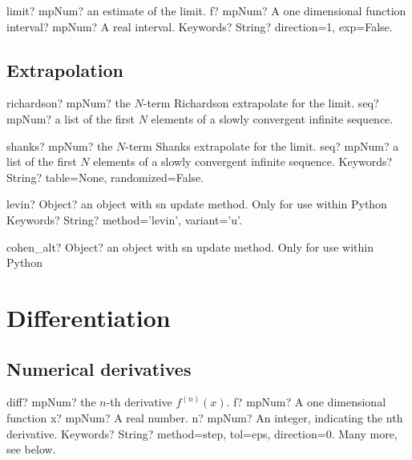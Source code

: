 \documentclass[12pt,a4paper,openany]{book}
\begin{document}
\begin{mpFunctionsExtract}
\mpFunctionThree
{limit? mpNum? an estimate of the limit.}
{f? mpNum? A one dimensional function}
{interval? mpNum? A real interval.}
{Keywords? String? direction=1, exp=False.}
\end{mpFunctionsExtract}

\section{Extrapolation}

\begin{mpFunctionsExtract}
\mpFunctionOne
{richardson? mpNum? the $N$-term Richardson extrapolate for the limit.}
{seq? mpNum? a list of the first $N$ elements of a slowly convergent infinite sequence.}
\end{mpFunctionsExtract}

\begin{mpFunctionsExtract}
\mpFunctionTwo
{shanks? mpNum? the $N$-term Shanks extrapolate for the limit.}
{seq? mpNum? a list of the first $N$ elements of a slowly convergent infinite sequence.}
{Keywords? String? table=None, randomized=False.}
\end{mpFunctionsExtract}

\begin{mpFunctionsExtract}
\mpFunctionOne
{levin? Object? an object with sn update method. Only for use within Python}
{Keywords? String? method='levin', variant='u'.}
\end{mpFunctionsExtract}

\begin{mpFunctionsExtract}
\mpFunctionZero
{cohen\_alt? Object? an object with sn update method. Only for use within Python}
\end{mpFunctionsExtract}

\chapter{Differentiation}

\section{Numerical derivatives}

\begin{mpFunctionsExtract}
\mpFunctionFour
{diff? mpNum? the $n$-th derivative $f^{(n)}(x)$.}
{f? mpNum? A one dimensional function}
{x? mpNum? A real number.}
{n? mpNum? An integer, indicating the nth derivative.}
{Keywords? String? method=step, tol=eps, direction=0. Many more, see below.}
\end{mpFunctionsExtract}
\end{document}
